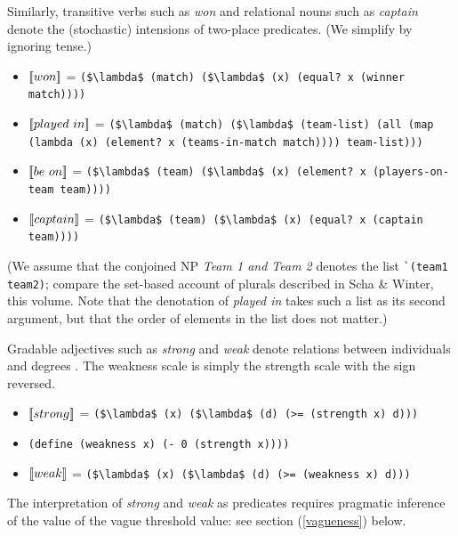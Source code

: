 \documentclass[12pt]{article}
\newcommand{\llbracket}{\ensuremath{\left [\!\left [}}%
\newcommand{\rrbracket}{\ensuremath{\right ]\!\right ]}}
\providecommand{\sv}[1]{\ensuremath{\llbracket #1 \rrbracket}}
\begin{document}
Similarly, transitive verbs such as \emph{won} and relational nouns such as \emph{captain} denote the (stochastic) intensions of two-place predicates. 
(We simplify by ignoring tense.)
\begin{itemize}
\item \sv{won} = \lstinline[mathescape]{($\lambda$ (match) ($\lambda$ (x) (equal? x (winner match))))}
\item \sv{played\ in} =  \lstinline[mathescape]{($\lambda$ (match) ($\lambda$ (team-list) (all (map (lambda (x) (element? x (teams-in-match match)))) team-list)))} 
\item \sv{be\ on} =  \lstinline[mathescape]{($\lambda$ (team) ($\lambda$ (x) (element? x (players-on-team team))))} 
\item \sv{captain} = \lstinline[mathescape]{($\lambda$ (team) ($\lambda$ (x) (equal? x (captain team))))}
\end{itemize}
(We assume that the conjoined NP \emph{Team 1 and Team 2} denotes the list \lstinline{`(team1 team2)}; compare the set-based account of plurals described in Scha \& Winter, this volume.
Note that the denotation of \emph{played in} takes such a list as its second argument, but that the order of elements in the list does not matter.)


Gradable adjectives such as \emph{strong} and \emph{weak} denote relations between individuals and degrees \citep[][etc.]{cresswell76,vonstechow84}. 
The weakness scale is simply the strength scale with the sign reversed. 
\begin{itemize}
\item \sv{strong} = \lstinline[mathescape]{($\lambda$ (x) ($\lambda$ (d) (>= (strength x) d)))}
\item \lstinline{(define (weakness x) (- 0 (strength x))))}
\item \sv{weak} = \lstinline[mathescape]{($\lambda$ (x) ($\lambda$ (d) (>= (weakness x) d)))}
\end{itemize}
The interpretation of \emph{strong} and \emph{weak} as predicates requires pragmatic inference of the value of the vague threshold value: see section (\ref{vagueness}) below.
\end{document}
